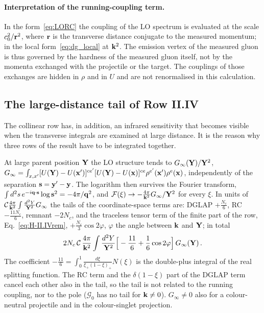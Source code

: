 \paragraph{Interpretation of the running-coupling term.} In the form~\eqref{eq:LORC} the coupling of the LO spectrum is evaluated at the scale $c_0^2/\mathbf{r}^2$, where $\mathbf{r}$ is the transverse distance conjugate to the measured momentum; in the local form~\eqref{eq:dg_local} at $\mathbf{k}^2$. The emission vertex of the measured gluon is thus governed by the hardness of the measured gluon itself, not by the momenta exchanged with the projectile or the target. The couplings of those exchanges are hidden in $\rho$ and in $U$ and are not renormalised in this calculation.

\subsection{The large-distance tail of Row II.IV}\label{sec:dg_tail}

The collinear row has, in addition, an infrared sensitivity that becomes visible when the transverse integrals are examined at large distance. It is the reason why three rows of the result have to be integrated together.

At large parent position $\mathbf{Y}$ the LO structure tends to $G_\infty(\mathbf{Y})/\mathbf{Y}^2$, $G_\infty=\int_{x,x'}[U(\mathbf{Y})-U(\mathbf{x}')]^{ce'}[U(\mathbf{Y})-U(\mathbf{x})]^{ce}\rho^{e'}(\mathbf{x}')\rho^e(\mathbf{x})$, independently of the separation $\mathbf{s}=\mathbf{y}'-\mathbf{y}$. The logarithm then survives the Fourier transform, $\int d^2s\,e^{-i\mathbf{q}\cdot\mathbf{s}}\log\mathbf{s}^2=-4\pi/\mathbf{q}^2$, and $\mathcal F(\xi)\to-\frac{4\pi}{\mathbf{k}^2}G_\infty/\mathbf{Y}^2$ for every $\xi$. In units of $\mathcal C\frac{4\pi}{\mathbf{k}^2}\int\frac{d^2Y}{\mathbf{Y}^2}G_\infty$ the tails of the coordinate-space terms are: DGLAP $+\frac{N_c}{6}$, RC $-\frac{11N_c}{6}$, remnant $-2N_c$, and the traceless tensor term of the finite part of the row, Eq.~\eqref{eq:H-II.IVrem}, $+\frac{N_c}{3}\cos2\varphi$, $\varphi$ the angle between $\mathbf{k}$ and $\mathbf{Y}$; in total
\begin{align}\label{eq:dg_tailtot}
2N_c\,\mathcal C\,\frac{4\pi}{\mathbf{k}^2}\int\frac{d^2Y}{\mathbf{Y}^2}\Big[-\frac{11}{6}+\frac16\cos2\varphi\Big]\,G_\infty(\mathbf{Y})\,.
\end{align}
The coefficient $-\frac{11}{6}=\int_0^1\frac{d\xi}{\xi_+(1-\xi)_+}N(\xi)$ is the double-plus integral of the real splitting function. The RC term and the $\delta(1-\xi)$ part of the DGLAP term cancel each other also in the tail, so the tail is not related to the running coupling, nor to the pole ($\mathcal G_0$ has no tail for $\mathbf{k}\neq0$). $G_\infty\neq0$ also for a colour-neutral projectile and in the colour-singlet projection.

